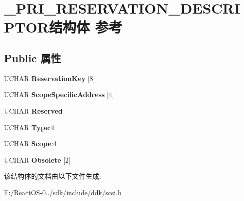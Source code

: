 \hypertarget{struct___p_r_i___r_e_s_e_r_v_a_t_i_o_n___d_e_s_c_r_i_p_t_o_r}{}\section{\+\_\+\+P\+R\+I\+\_\+\+R\+E\+S\+E\+R\+V\+A\+T\+I\+O\+N\+\_\+\+D\+E\+S\+C\+R\+I\+P\+T\+O\+R结构体 参考}
\label{struct___p_r_i___r_e_s_e_r_v_a_t_i_o_n___d_e_s_c_r_i_p_t_o_r}
\subsection*{Public 属性}
\begin{DoxyCompactItemize}
\item 
\mbox{\label{struct___p_r_i___r_e_s_e_r_v_a_t_i_o_n___d_e_s_c_r_i_p_t_o_r_a540d0998c1cea051423d55d895ce6e11}} 
U\+C\+H\+AR {\bfseries Reservation\+Key} \mbox{[}8\mbox{]}
\item 
\mbox{\label{struct___p_r_i___r_e_s_e_r_v_a_t_i_o_n___d_e_s_c_r_i_p_t_o_r_a2db1f12a3b0c32ceffa85da78d4182dd}} 
U\+C\+H\+AR {\bfseries Scope\+Specific\+Address} \mbox{[}4\mbox{]}
\item 
\mbox{\label{struct___p_r_i___r_e_s_e_r_v_a_t_i_o_n___d_e_s_c_r_i_p_t_o_r_af9eacb3777960af89f77d3ac974629e0}} 
U\+C\+H\+AR {\bfseries Reserved}
\item 
\mbox{\label{struct___p_r_i___r_e_s_e_r_v_a_t_i_o_n___d_e_s_c_r_i_p_t_o_r_aeca6242af493e6f0807a962231c3f0e5}} 
U\+C\+H\+AR {\bfseries Type}\+:4
\item 
\mbox{\label{struct___p_r_i___r_e_s_e_r_v_a_t_i_o_n___d_e_s_c_r_i_p_t_o_r_af56bbc1ab3381fcd3cf74ebe833d74fe}} 
U\+C\+H\+AR {\bfseries Scope}\+:4
\item 
\mbox{\label{struct___p_r_i___r_e_s_e_r_v_a_t_i_o_n___d_e_s_c_r_i_p_t_o_r_ad432d2637fec2d73c9679ee955fc8d58}} 
U\+C\+H\+AR {\bfseries Obsolete} \mbox{[}2\mbox{]}
\end{DoxyCompactItemize}


该结构体的文档由以下文件生成\+:\begin{DoxyCompactItemize}
\item 
E\+:/\+React\+O\+S-\/0../sdk/include/ddk/scsi.\+h\end{DoxyCompactItemize}
